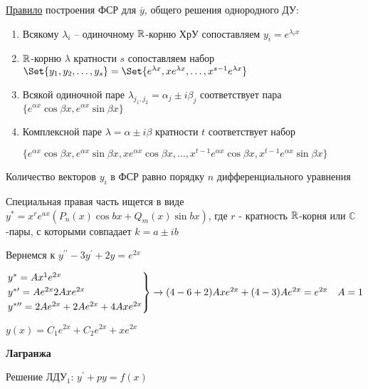\documentclass[12pt]{article}
\begin{document}
    \mediumvspace

    \underline{Правило} построения ФСР для $\overline{y}$, общего решения однородного ДУ:

    \begin{enumerate}
        \item Всякому $\lambda_i$ -- одиночному $\mathbb{R}$-корню ХрУ сопоставляем $y_i = e^{\lambda_i x}$

        \item $\mathbb{R}$-корню $\lambda$ кратности $s$ сопоставляем набор $\Set{y_1, y_2, \dots, y_s} = \Set{e^{\lambda x}, xe^{\lambda x}, \dots, x^{s - 1} e^{\lambda x}}$

        \item Всякой одиночной паре $\lambda_{j_1,j_2} = \alpha_j \pm i\beta_j$ соответствует пара $\{e^{\alpha x} \cos\beta x, e^{\alpha x} \sin\beta x\}$

        \item Комплексной паре $\lambda = \alpha \pm i\beta$ кратности $t$ соответствует набор 
        
        $\{e^{\alpha x} \cos \beta x, e^{\alpha x} \sin \beta x, x e^{\alpha x} \cos \beta x, \dots, x^{t - 1}e^{\alpha x} \cos\beta x, x^{t - 1}e^{\alpha x} \sin\beta x\}$
    \end{enumerate}

    \Nota Количество векторов $y_i$ в ФСР равно порядку $n$ дифференциального уравнения

    Специальная правая часть ищется в виде $y^* = x^r e^{ax} (P_n(x)\cos bx + Q_m (x)\sin bx)$, где $r$ - кратность $\mathbb{R}$-корня или $\mathbb{C}$-пары, с которыми совпадает $k = a \pm ib$

    \Ex Вернемся к $y^{\prime\prime} - 3y^\prime + 2y = e^{2x}$

    $\begin{rcases*}
    y^* = Ax^1 e^{2x} \\
    y^{*\prime} = Ae^{2x} 2Axe^{2x} \\
    y^{*\prime\prime} = 2Ae^{2x} + 2Ae^{2x} + 4Axe^{2x}
    \end{rcases*} \to (4 - 6 + 2) Axe^{2x} + (4 - 3) Ae^{2x} = e^{2x} \quad A = 1$

    $y(x) = C_1 e^{2x} + C_2 e^{2x} + xe^{2x}$

    \mediumvspace

    \item \textbf{Лагранжа}

    \Mems Решение ЛДУ$_1$: $y^\prime + py = f(x)$
\end{document}
